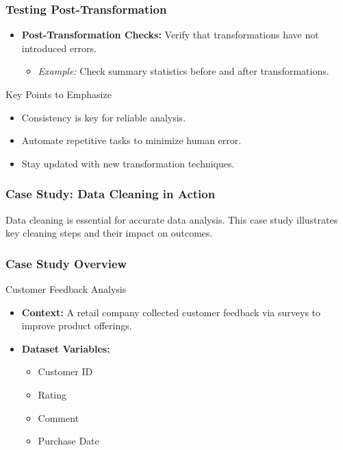 \documentclass[aspectratio=169]{beamer}
\begin{document}
\begin{frame}[fragile]
    \frametitle{Testing Post-Transformation}
    \begin{itemize}
        \item \textbf{Post-Transformation Checks:} Verify that transformations have not introduced errors.
        \begin{itemize}
            \item \textit{Example:} Check summary statistics before and after transformations.
        \end{itemize}
    \end{itemize}

    \begin{block}{Key Points to Emphasize}
        \begin{itemize}
            \item Consistency is key for reliable analysis.
            \item Automate repetitive tasks to minimize human error.
            \item Stay updated with new transformation techniques.
        \end{itemize}
    \end{block}
\end{frame}

\begin{frame}
    \frametitle{Case Study: Data Cleaning in Action}
    Data cleaning is essential for accurate data analysis. This case study illustrates key cleaning steps and their impact on outcomes.
\end{frame}

\begin{frame}
    \frametitle{Case Study Overview}
    \begin{block}{Customer Feedback Analysis}
        \begin{itemize}
            \item \textbf{Context:} A retail company collected customer feedback via surveys to improve product offerings.
            \item \textbf{Dataset Variables:} 
                \begin{itemize}
                    \item Customer ID
                    \item Rating
                    \item Comment
                    \item Purchase Date
                \end{itemize}
        \end{itemize}
    \end{block}
\end{frame}
\end{document}
